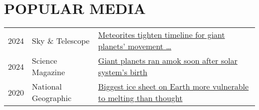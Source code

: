 \section*{POPULAR MEDIA}

\begin{tabular}{l l l} 
2024 & Sky \& Telescope & \href{https://skyandtelescope.org/astronomy-news/meteorites-tighten-timeline-for-giant-planets-movement-through-the-solar-system/}{Meteorites tighten timeline for giant planets' movement \dots}
\\
2024 & Science Magazine & \href{https://www.science.org/content/article/giant-planets-ran-amok-soon-after-solar-system-s-birth}{Giant planets ran amok soon after solar system's birth}
\\
2020 & National Geographic & \href{https://www.nationalgeographic.com/science/article/east-antarctic-ice-sheet-more-vulnerable-to-melting-than-thought}{Biggest ice sheet on Earth more vulnerable to melting than thought}
\end{tabular}